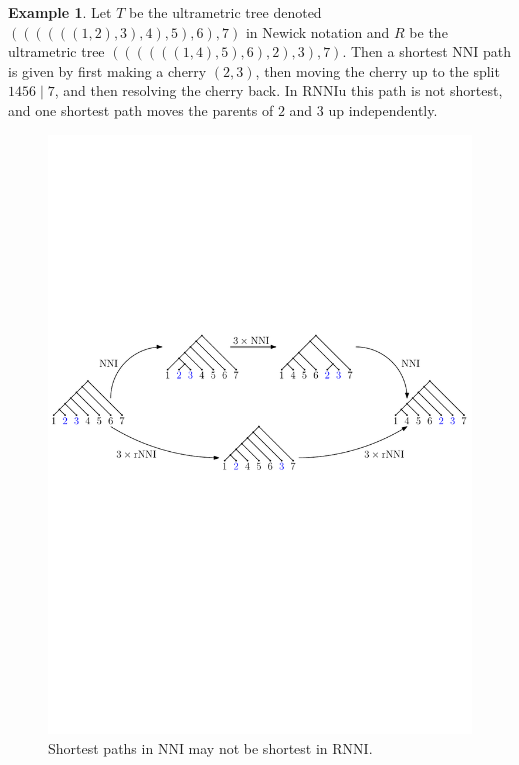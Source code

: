 \documentclass[11pt]{amsart}
\theoremstyle{definition}
\newtheorem{example}[lemma]{Example}
\newcommand{\nni}{\mathrm{NNI}}
\newcommand{\rnni}{\mathrm{RNNI}}
\newcommand{\rnniu}{\mathrm{RNNIu}}
\begin{document}
\begin{example}
Let $T$ be the ultrametric tree denoted $((((((1, 2), 3), 4), 5), 6), 7)$ in Newick notation \autocite{felsenstein1990newick} and $R$ be the ultrametric tree $((((((1, 4), 5), 6), 2), 3), 7)$.
Then a shortest $\nni$ path is given by first making a cherry $(2,3)$, then moving the cherry up to the split $1456 \mid 7$, and then resolving the cherry back.
In $\rnniu$ this path is not shortest, and one shortest path moves the parents of $2$ and $3$ up independently.

\begin{figure}[ht]
\centering
\includegraphics[width=\textwidth]{NNI_VS_rNNI.pdf}
\caption{Shortest paths in $\nni$ may not be shortest in $\rnni$.}
\label{NNI_VS_rNNI.pdf}
\end{figure}
\end{example}
\end{document}
